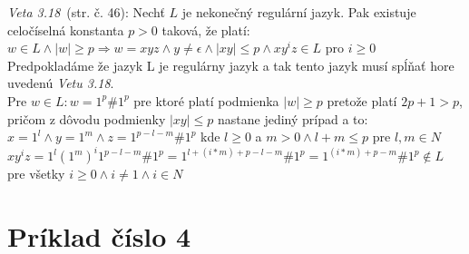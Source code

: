 \documentclass[11pt,a4paper]{article}
\begin{document}
\textit{Veta 3.18}~\cite{TIN}(str. č. 46): Nechť $L$ je nekonečný regulární jazyk. Pak existuje celočíselná konstanta $p>0$ taková, že platí: $w \in L \wedge |w| \geq p \Rightarrow w = xyz \wedge y \neq \epsilon \wedge |xy| \leq p \wedge xy^iz \in L$ pro $i \geq 0$\\

Predpokladáme že jazyk L je regulárny jazyk a tak tento jazyk musí spĺňať hore uvedenú \textit{Vetu 3.18}.\\

Pre $w \in L: w=1^p\#1^p$ pre ktoré platí podmienka $|w| \geq p$ pretože platí $2p+1>p$, pričom z dôvodu podmienky $|xy| \leq p$ nastane jediný prípad a to:\\

$x=1^l \wedge y=1^m \wedge z=1^{p-l-m}\#1^p$ kde $l \geq 0$ a $m > 0 \wedge l+m \leq p$ pre $l,m \in N$\\

$xy^iz = 1^l(1^{m})^i1^{p-l-m}\#1^p = 1^{l+(i*m)+p-l-m}\#1^p = 1^{(i*m)+p-m}\#1^p \notin L$ pre všetky $i \geq 0 \wedge i \neq 1 \wedge i \in N$\\


\section{Príklad číslo 4}
\end{document}
